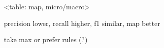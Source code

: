 <table: map, micro/macro>

precision lower, recall higher, f1 similar, map better

take max or prefer rules (?)
